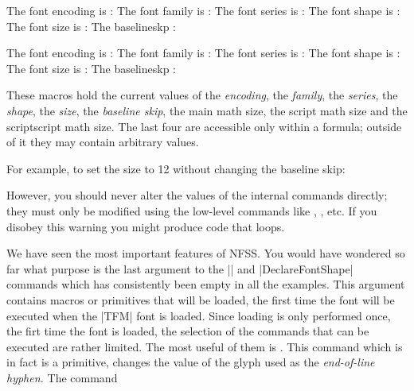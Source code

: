 \begin{multicols}{2}
\begin{teX}
\makeatletter
{\obeylines\noindent\obeyspaces
The font encoding is : \f@encoding
The font family is   : \f@family
The font series is   : \f@series
The font shape is    : \f@shape
The font size is     : \f@size
The baselineskp      : \f@baselineskip}
\makeatother
\end{teX}

\makeatletter
{\obeylines\noindent\obeyspaces
The font encoding is : \f@encoding
The font family is   : \f@family
The font series is   : \f@series
The font shape is    : \f@shape
The font size is     : \f@size
The baselineskp      : \f@baselineskip}
\makeatother

These macros hold the current values of the \textit{encoding}, the \textit{family}, the \textit{series}, the \textit{shape}, the \textit{size}, the \textit{baseline skip}, the main math size, the script math size and the scriptscript math size. The last four are accessible only within a formula; outside of it they may contain arbitrary values.

For example, to set the size to 12 without changing the baseline skip:

\begin{teX}
   \fontsize{12}{\f@baselineskip}
\end{teX}

However, you should never alter the values of the internal commands directly; they must only be modified using the low-level commands like , , etc. If you disobey this warning you might produce code that loops.

We have seen the most important features of NFSS. You would have wondered so far what purpose is the last argument
to the |\DeclareFontFamily| and |DeclareFontShape| commands which has consistently been empty in all the examples. This argument contains \tex macros or primitives that will be loaded, the first time the font will be executed when the |TFM| font is loaded. Since loading is only performed once, the firt time the font is loaded, the selection of the commands that can be executed are rather limited. The most useful of them is . This command which is in fact is a \tex primitive, changes the value of the glyph used as the \textit{end-of-line hyphen.} The command

\begin{teX}
\end{teX}


\end{multicols}
